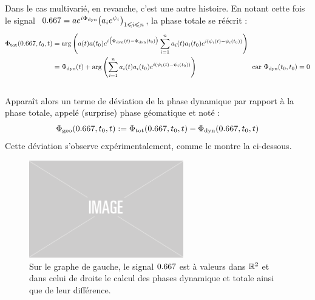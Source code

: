 Dans le cas multivarié, en revanche, c'est une autre histoire. En notant cette fois le signal $\ \x = ae^{i\phased} \big( a_ie^{\psi_i} \big)_{1\leq i\leq n}$, la phase totale se réécrit :
\begin{equation}\label{eq:diff_phases_t/d}
	\begin{aligned}
		\phaset(\x,t_0, t) &= \arg \left(a(t)a(t_0) e^{i\big(\phased(t) - \phased(t_0)\big)}\sum_{i=1}^n a_i(t)a_i(t_0)e^{i(\psi_i(t)-\psi_i(t_0))} \right) \\
		&= \phased(t) + \arg \left(\sum_{i=1}^n a_i(t)a_i(t_0)e^{i(\psi_i(t)-\psi_i(t_0))} \right)  \qquad\qquad\qquad\qquad \text{car } \phased(t_0,t_0) = 0
	\end{aligned}
\end{equation}
\\
Apparaît alors un terme de déviation de la phase dynamique par rapport à la phase totale, appelé (surprise) phase géomatique et noté :
\begin{equation}\label{eq:phase_g}
	\phaseg(\x,t_0,t) \defeq \phaset(\x, t_0,t) - \phased(\x, t_0,t)
\end{equation}
Cette déviation s'observe expérimentalement, comme le montre la  ci-dessous.
\\
\begin{figure}[h]
	\includegraphics[width=0.6\textwidth]{fig/placeholder}
	\caption[Déviation de la phase dynamique par rapport à la phase totale]{Sur le graphe de gauche, le signal $\x$ est à valeurs dans $\mathbb{R}^2$ et dans celui de droite le calcul des phases dynamique et totale ainsi que de leur différence. %
	}
	\label{fig:calc_diff_phases}
\end{figure}
\\

